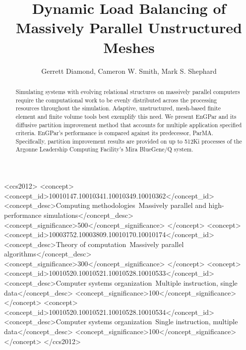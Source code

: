 \documentclass[sigconf]{acmart}
\begin{document}
\title{Dynamic Load Balancing of Massively Parallel Unstructured Meshes}

\author{Gerrett Diamond, Cameron W. Smith, Mark S. Shephard}

\renewcommand{\shortauthors}{G. Diamond et al.}

\begin{abstract}
  Simulating systems with evolving relational structures on massively
  parallel computers require the computational work to be evenly
  distributed across the processing resources throughout the simulation.
  Adaptive, unstructured, mesh-based finite element and finite volume
  tools best exemplify this need.
  We present EnGPar and its diffusive partition improvement method that accounts
  for multiple application specified criteria.
  EnGPar's performance is compared against its predecessor, ParMA.
  Specifically, partition improvement results are provided on
  up to 512Ki processes of the
  Argonne Leadership Computing Facility's Mira BlueGene/Q system.
\end{abstract}

%
%
\begin{CCSXML}
<ccs2012>
<concept>
<concept_id>10010147.10010341.10010349.10010362</concept_id>
<concept_desc>Computing methodologies~Massively parallel and high-performance simulations</concept_desc>
<concept_significance>500</concept_significance>
</concept>
<concept>
<concept_id>10003752.10003809.10010170.10010174</concept_id>
<concept_desc>Theory of computation~Massively parallel algorithms</concept_desc>
<concept_significance>300</concept_significance>
</concept>
<concept>
<concept_id>10010520.10010521.10010528.10010533</concept_id>
<concept_desc>Computer systems organization~Multiple instruction, single data</concept_desc>
<concept_significance>100</concept_significance>
</concept>
<concept>
<concept_id>10010520.10010521.10010528.10010534</concept_id>
<concept_desc>Computer systems organization~Single instruction, multiple data</concept_desc>
<concept_significance>100</concept_significance>
</concept>
</ccs2012>
\end{CCSXML}




\maketitle





\end{document}
